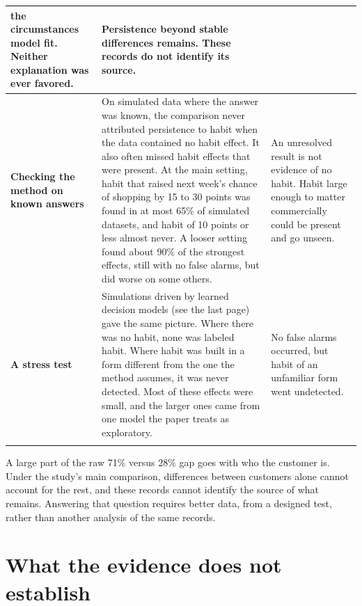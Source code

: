 \documentclass[11pt]{article}
\newcommand{\src}[1]{{\color{muted}\footnotesize #1}}
\begin{document}
{\begin{tabularx}{\textwidth}{@{}L{2.9cm}YL{4.4cm}@{}}
the circumstances model fit. Neither explanation was ever favored. &
Persistence beyond stable differences remains. These records do not identify its source. \\
\midrule
\textbf{Checking the method on known answers}\newline\src{§6.1, Figure 1} &
On simulated data where the answer was known, the comparison never attributed persistence to
habit when the data contained no habit effect. It also often missed habit effects that were
present. At the main setting, habit that raised next week's chance of shopping by 15 to 30 points was found in at most 65\% of
simulated datasets, and habit of 10 points or less almost never. A looser setting found about
90\% of the strongest effects, still with no false alarms, but did worse on some others. &
An unresolved result is not evidence of no habit. Habit large enough to matter commercially
could be present and go unseen. \\
\midrule
\textbf{A stress test}\newline\src{§7, Table 5} &
Simulations driven by learned decision models (see the last page) gave the same picture. Where
there was no habit, none was labeled habit. Where habit was built in a form different from the
one the method assumes, it was never detected. Most of these effects were small, and the larger
ones came from one model the paper treats as exploratory. &
No false alarms occurred, but habit of an unfamiliar form went undetected. \\
\bottomrule[0.6pt]
\end{tabularx}
}

\vspace{4pt}
A large part of the raw 71\% versus 28\% gap goes with who the customer is. Under the study's
main comparison, differences between customers alone cannot account for the rest, and these
records cannot identify the source of what remains. Answering that question requires better data, from
a designed test, rather than another analysis of the same records.

\section{What the evidence does not establish}
\end{document}
